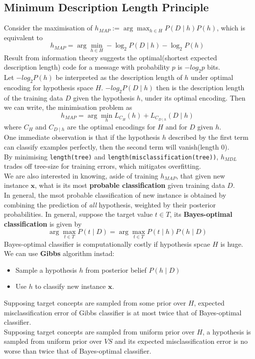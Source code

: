 \documentclass[12pt]{article}
\theoremstyle{definition}
\begin{document}
\subsection{Minimum Description Length Principle}
Consider the maximisation of $h_{MAP}:=\arg\max_{h\in H} P(D\mid h)P(h)$, which is equivalent to 
\[
h_{MAP}=\arg\min_{h\in H} -\log_2 P(D\mid h)-\log_2P(h)
\]
Result from information theory suggests the optimal(shortest expected description length) code for a message with probability $p$ is $-log_2 p$ bits.\\
Let $-log_2P(h)$ be interpreted as the description length of $h$ under optimal encoding for hypothesis space $H$. $-log_2P(D\mid h)$ then is the description length of the training data $D$ given the hypothesis $h$, under its optimal encoding. Then we can write, the minimisation problem as
\[
h_{MAP}=\arg\min_h L_{C_H}(h) + L_{C_{D\mid h}}(D\mid h)
\]
where $C_H$ and $C_{D\mid h}$ are the optimal encodings for $H$ and for $D$ given $h$.\\
One immediate observation is that if the hypothesis $h$ described by the first term can classify examples perfectly, then the second term will vanish(length 0).\\
By minimising \texttt{length(tree)} and \texttt{length(misclassification(tree))}, $h_{MDL}$ trades off tree-size for training errors, which mitigates overfitting.\\
We are also interested in knowing, aside of training $h_{MAP}$, that given new instance $\mathbf{x}$, what is its most \textbf{probable classification} given training data $D$.\\
In general, the msot probable classification of new instance is obtained by combining the prediction of \textit{all} hypothesis, weighted by their posterior probabilities. In general, suppose the target value $t\in T$, its \textbf{Bayes-optimal classification} is given by
\[
\arg\max_{t\in T}P(t\mid D) = \arg\max_{t\in T}P(t\mid h)P(h\mid D)
\]
Bayes-optimal classifier is computationally costly if hypothesis spcae $H$ is huge. We can use \textbf{Gibbs} algorithm instad:
\begin{itemize}
	\item Sample a hypothesis $h$ from posterior belief $P(h\mid D)$
	\item Use $h$ to classify new instance $\mathbf{x}$.
\end{itemize}
Supposing target concepts are sampled from some prior over $H$, expected misclassification error of Gibbs classifier is at most twice that of Bayes-optimal classifier.\\
Supposing target concepts are sampled from uniform prior over $H$, a hypothesis is sampled from uniform prior over $VS$ and its expected misclassification error is no worse than twice that of Bayes-optimal classifier.
\end{document}
